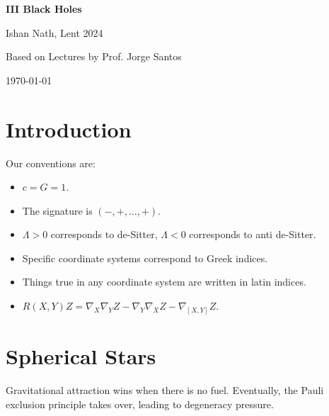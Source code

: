\documentclass[12pt]{article}
\begin{document}
\hypersetup{pageanchor=false}
\begin{titlepage}
	\begin{center}
		\vspace*{1em}
		\Huge
		\textbf{III Black Holes}

		\vspace{1em}
		\large
		Ishan Nath, Lent 2024

		\vspace{1.5em}

		\Large

		Based on Lectures by Prof. Jorge Santos

		\vspace{1em}

		\large
		\today
	\end{center}
	
\end{titlepage}
\hypersetup{pageanchor=true}

\tableofcontents

\newpage


\setcounter{section}{-1}

\section{Introduction}%
\label{sec:int}

Our conventions are:
\begin{itemize}
	\item $c = G = 1$.
	\item The signature is $(-, +, \ldots, +)$.
	\item $\Lambda > 0$ corresponds to de-Sitter, $\Lambda < 0$ corresponds to anti de-Sitter.
	\item Specific coordinate systems correspond to Greek indices.
	\item Things true in any coordinate system are written in latin indices.
	\item $R(X,Y)Z = \nabla_X \nabla_Y Z - \nabla_Y \nabla_X Z - \nabla_{[X,Y]}Z$.
\end{itemize}

\newpage

\section{Spherical Stars}%
\label{sec:ss}

Gravitational attraction wins when there is no fuel. Eventually, the Pauli exclusion principle takes over, leading to degeneracy pressure.
\end{document}

